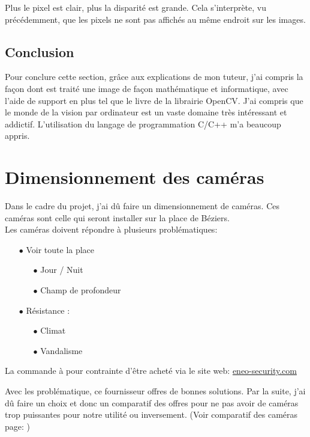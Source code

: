 \documentclass[12pt, french]{report}
\begin{document}
Plus le pixel est clair, plus la disparité est grande. Cela s'interprète, vu précédemment, que les pixels ne sont pas affichés au même endroit sur les images.

\subsection{Conclusion}

Pour conclure cette section, grâce aux explications de mon tuteur, j'ai compris la façon dont est traité une image de façon mathématique et informatique, avec l'aide de support en plus tel que le livre de la librairie OpenCV. J'ai compris que le monde de la vision par ordinateur est un vaste domaine très intéressant et addictif. L'utilisation du langage de programmation C/C++ m'a beaucoup appris.



\newpage
\section{Dimensionnement des caméras}

Dans le cadre du projet, j'ai dû faire un dimensionnement de caméras. Ces caméras sont celle qui seront installer sur la place de Béziers.\\

Les caméras doivent répondre à plusieurs problématiques:
\begin{itemize}
    \item[$\bullet$] Voir toute la place
    \begin{itemize}
        \item[$\bullet$] Jour / Nuit
        \item[$\bullet$] Champ de profondeur
    \end{itemize}
    \item[$\bullet$] Résistance :
    \begin{itemize}
        \item[$\bullet$] Climat
        \item[$\bullet$]Vandalisme
    \end{itemize}
\end{itemize}

La commande à pour contrainte d'être acheté via le site web: \href{eneo-security.com}{eneo-security.com}\newline

Avec les problématique, ce fournisseur offres de bonnes solutions. Par la suite, j'ai dû faire un choix et donc un comparatif des offres pour ne pas avoir de caméras trop puissantes pour notre utilité ou inversement.  (Voir comparatif des caméras page: \pageref{Comparatif.pdf})
\end{document}
